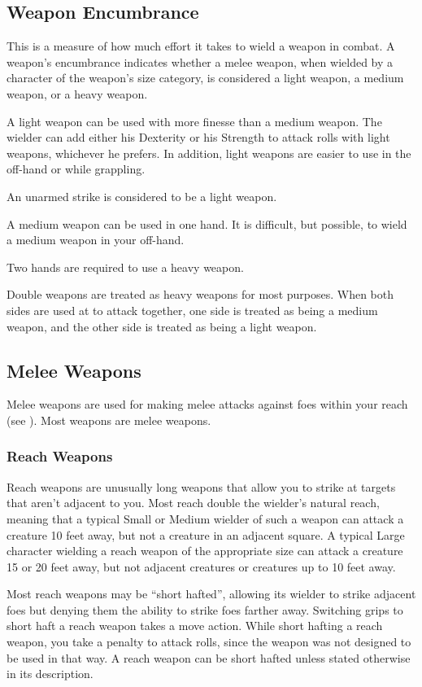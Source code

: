 \subsection{Weapon Encumbrance}
This is a measure of how much effort it takes to wield a weapon in combat. A weapon's encumbrance indicates whether a melee weapon, when wielded by a character of the weapon's size category, is considered a light weapon, a medium weapon, or a heavy weapon.

 A light weapon can be used with more finesse than a medium weapon. The wielder can add either his Dexterity or his Strength to attack rolls with light weapons, whichever he prefers. In addition, light weapons are easier to use in the off-hand or while grappling.

An unarmed strike is considered to be a light weapon.

 A medium weapon can be used in one hand. It is difficult, but possible, to wield a medium weapon in your off-hand.

 Two hands are required to use a heavy weapon.

 Double weapons are treated as heavy weapons for most purposes. When both sides are used at to attack together, one side is treated as being a medium weapon, and the other side is treated as being a light weapon.

\subsection{Melee Weapons}
Melee weapons are used for making melee attacks against foes within your reach (see ). Most weapons are melee weapons.

\subsubsection{Reach Weapons}
Reach weapons are unusually long weapons that allow you to strike at targets that aren't adjacent to you. Most reach double the wielder's natural reach, meaning that a typical Small or Medium wielder of such a weapon can attack a creature 10 feet away, but not a creature in an adjacent square. A typical Large character wielding a reach weapon of the appropriate size can attack a creature 15 or 20 feet away, but not adjacent creatures or creatures up to 10 feet away.

 Most reach weapons may be ``short hafted'', allowing its wielder to strike adjacent foes but denying them the ability to strike foes farther away. Switching grips to short haft a reach weapon takes a move action. While short hafting a reach weapon, you take a  penalty to attack rolls, since the weapon was not designed to be used in that way. A reach weapon can be short hafted unless stated otherwise in its description.

